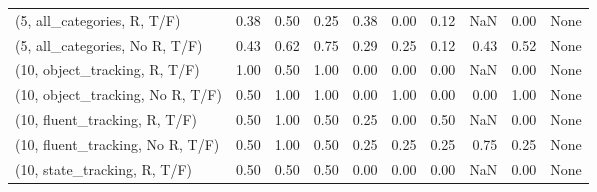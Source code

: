 \begin{table*}[h!]
\begin{adjustbox}{width=2\columnwidth,center}
\begin{tabular}{lrrr|rrr|rrr}
(5, all\_categories, R, T/F)          &                      0.38 &                  0.50 &                      0.25 &                          0.38 &                      0.00 &                          0.12 &                                    NaN &                               0.00 &                                  None \\
(5, all\_categories, No R, T/F)       &                      0.43 &                  0.62 &                      0.75 &                          0.29 &                      0.25 &                          0.12 &                                   0.43 &                               0.52 &                                  None \\



\midrule
(10, object\_tracking, R, T/F)         &                      1.00 &                  0.50 &                      1.00 &                          0.00 &                      0.00 &                          0.00 &                                    NaN &                               0.00 &                                  None \\
(10, object\_tracking, No R, T/F)      &                      0.50 &                  1.00 &                      1.00 &                          0.00 &                      1.00 &                          0.00 &                                   0.00 &                               1.00 &                                  None \\
(10, fluent\_tracking, R, T/F)         &                      0.50 &                  1.00 &                      0.50 &                          0.25 &                      0.00 &                          0.50 &                                    NaN &                               0.00 &                                  None \\
(10, fluent\_tracking, No R, T/F)      &                      0.50 &                  1.00 &                      0.50 &                          0.25 &                      0.25 &                          0.25 &                                   0.75 &                               0.25 &                                  None \\
(10, state\_tracking, R, T/F)          &                      0.50 &                  0.50 &                      0.50 &                          0.00 &                      0.00 &                          0.00 &                                    NaN &                               0.00 &                                  None \\

\end{tabular}
\end{adjustbox}
\end{table*}
